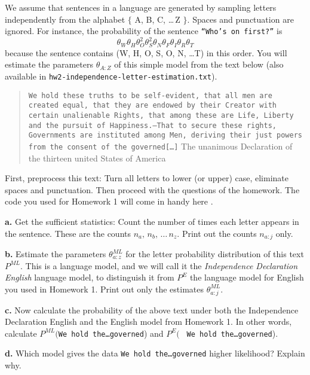 \documentclass[10pt]{article}
\newcommand{\comment}[1]{}
\newcommand{\ML}{^{ML}}
\begin{document}
We assume that sentences in a language are generated by sampling
letters independently from the alphabet $\{$ A, B, C, \ldots \,Z
$\}$. Spaces and punctuation are ignored. For instance, the
probability of the sentence {\tt ``Who's on first?''} is
\[
\theta_W\theta_H\theta_O^2\theta_S^2\theta_N\theta_F\theta_I\theta_R\theta_T
\]
because the sentence contains (W, H, O, S, O, N, \ldots T) in this order.
You will estimate the parameters $\theta_{A:Z}$ of this simple model from the text below (also available in {\tt hw2-independence-letter-estimation.txt}).

\begin{quote}
 {\tt We hold these truths to be self-evident, that all men are created equal, that they are endowed by their Creator with certain unalienable Rights, that among these are Life, Liberty and the pursuit of Happiness.--That to secure these rights, Governments are instituted among Men, deriving their just powers from the consent of the governed[\ldots]}
 \hfill The unanimous Declaration of the thirteen united States of America
 \comment{
{\tt To save man from the morass of propaganda, in my opinion, is one of the chief aims of education. Education must enable one to sift and weigh evidence, to discern the true from the false, the real from the unreal, and the facts from the fiction. [\ldots]
The function of education, therefore, is to teach one to think intensively and to think critically.}

\hfill Martin Luther King, Jr., {\em The Purpose of Education}}%
\end{quote}

First, preprocess this text: Turn all letters to lower (or upper)
case, eliminate spaces and punctuation. Then proceed with the
questions of the homework. The code you used for Homework 1 will come in handy here . 

{\bf a.} Get the sufficient statistics: Count the number of times each
letter appears in the sentence. These are the counts
$n_a,\,n_b,\,\ldots \,n_z$. Print out the counts $n_{a:j}$ only.


{\bf b.} Estimate the parameters $\theta\ML_{a:z}$ for the letter probability distribution of this text $P\ML$. This is a language model, and we will call it the {\em Independence Declaration English} language model, to distinguish it from $P^{E}$ the language model for English you used in Homework 1. Print out only the estimates $\theta\ML_{a:j}$. 

{\bf c.} Now calculate the probability of the above text under both
the Independence Declaration English and the English model from
Homework 1. In other words, calculate $P\ML(${\tt We hold the\ldots governed}) and $P^E($ {\tt
  We hold the\ldots governed}).

{\bf d.} Which model gives the data {\tt   We hold the\ldots governed} higher likelihood? Explain why.
\end{document}
